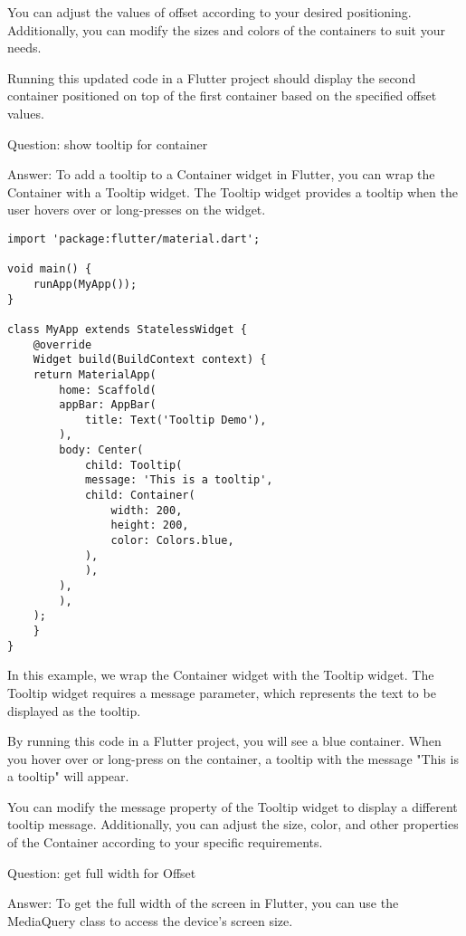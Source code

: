 You can adjust the values of offset according to your desired positioning. Additionally, you can modify the sizes 
and colors of the containers to suit your needs.

Running this updated code in a Flutter project should display the second container positioned on top of the first 
container based on the specified offset values.


Question: show tooltip for container

Answer: To add a tooltip to a Container widget in Flutter, you can wrap the Container with a Tooltip widget. 
The Tooltip widget provides a tooltip when the user hovers over or long-presses on the widget.

\begin{lstlisting}
import 'package:flutter/material.dart';

void main() {
    runApp(MyApp());
}

class MyApp extends StatelessWidget {
    @override
    Widget build(BuildContext context) {
    return MaterialApp(
        home: Scaffold(
        appBar: AppBar(
            title: Text('Tooltip Demo'),
        ),
        body: Center(
            child: Tooltip(
            message: 'This is a tooltip',
            child: Container(
                width: 200,
                height: 200,
                color: Colors.blue,
            ),
            ),
        ),
        ),
    );
    }
}    
\end{lstlisting}

In this example, we wrap the Container widget with the Tooltip widget. The Tooltip widget requires a message parameter, 
which represents the text to be displayed as the tooltip.

By running this code in a Flutter project, you will see a blue container. When you hover over or long-press on 
the container, a tooltip with the message "This is a tooltip" will appear.

You can modify the message property of the Tooltip widget to display a different tooltip message. Additionally, 
you can adjust the size, color, and other properties of the Container according to your specific requirements.


Question: get full width for Offset

Answer: To get the full width of the screen in Flutter, you can use the MediaQuery class to access the 
device's screen size.


